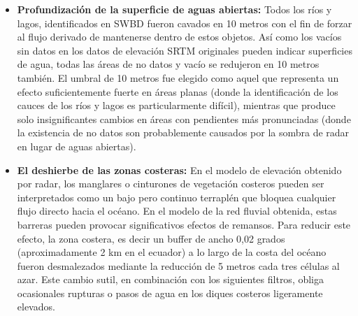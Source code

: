 \documentclass[10pt,a4paper, twoside]{report}
\begin{document}
\begin{itemize}
	\item \textbf{Profundización de la superficie de aguas abiertas:} Todos los ríos y lagos, identificados en SWBD fueron cavados en 10 metros con el fin de forzar al flujo derivado de mantenerse dentro de estos objetos. Así como los vacíos sin datos en los datos de elevación SRTM originales pueden indicar superficies de agua, todas las áreas de no datos y vacío se redujeron en 10 metros también. El umbral de 10 metros fue elegido como aquel que representa un efecto suficientemente fuerte en áreas planas (donde la identificación de los cauces de los ríos y lagos es particularmente difícil), mientras que produce solo insignificantes cambios en áreas con pendientes más pronunciadas (donde la existencia de no datos son probablemente causados por la sombra de radar en lugar de aguas abiertas).
	
	\item \textbf{El deshierbe de las zonas costeras:} En el modelo de elevación obtenido por radar, los manglares o cinturones de vegetación costeros pueden ser interpretados como un bajo pero continuo terraplén que bloquea cualquier flujo directo hacia el océano. En el modelo de la red fluvial obtenida, estas barreras pueden provocar significativos efectos de remansos. Para reducir este efecto, la zona costera, es decir un buffer de ancho 0,02 grados (aproximadamente 2 km en el ecuador) a lo largo de la costa del océano fueron desmalezados mediante la reducción de 5 metros cada tres células al azar. Este cambio sutil, en combinación con los siguientes filtros, obliga ocasionales rupturas o pasos de agua en los diques costeros ligeramente elevados.
	

\end{itemize}
\end{document}
